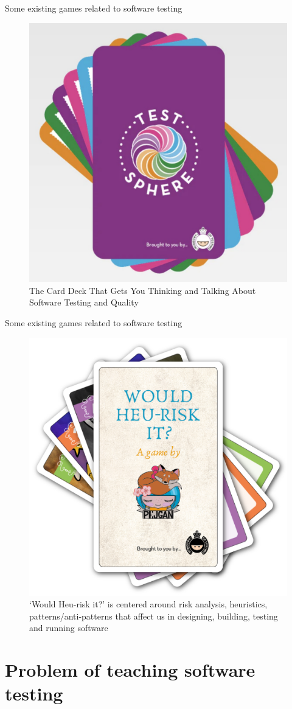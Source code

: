 \documentclass[aspectratio=169]{beamer}
\begin{document}
\begin{frame}{Some existing games related to software testing}
\begin{figure}
    \centering
    \includegraphics[width=0.5\linewidth]{presentation//images//games/testsphere}
    \caption{The Card Deck That Gets You Thinking and Talking About Software Testing and Quality}
\end{figure}
\end{frame}

\begin{frame}{Some existing games related to software testing}
\begin{figure}
    \centering
    \includegraphics[width=0.5\linewidth]{presentation//images//games/would}
    \caption{`Would Heu-risk it?' is centered around risk analysis, heuristics, patterns/anti-patterns that affect us in designing, building, testing and running software}
\end{figure}
\end{frame}

\section{Problem of teaching software testing}
\end{document}
